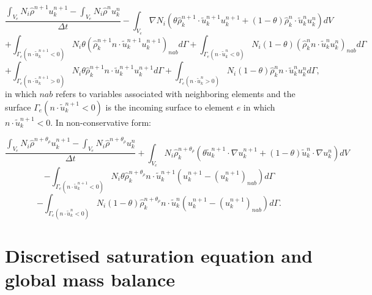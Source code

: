 \begin{equation}
\frac{
\int_{V_e} N_i \hat\rho^{n+1} u^{n+1}_k -
\int_{V_e} N_i \hat\rho^{n} u^{n}_k }
{\Delta t} 
- 
\int_{V_e} \nabla N_i 
(\theta \hat\rho_k^{n+1} \cdot \tilde u_k^{n+1} u_k^{n+1} +
(1-\theta) \hat\rho_k^{n} \cdot \tilde u_k^{n} u_k^{n} ) dV 
\label{inertia-disc-cons-1} 
\end{equation}
\begin{equation}
+ 
\int_{\Gamma_e (n\cdot \tilde u_k^{n+1}<0)} 
 N_i \theta ( \hat\rho_k^{n+1} n\cdot \tilde u_k^{n+1}  
u_k^{n+1})_{nab}  d\Gamma 
+ 
\int_{\Gamma_e (n\cdot \tilde u_k^{n}<0)} 
 N_i(1-\theta) (\hat\rho_k^{n} n\cdot \tilde u_k^{n} 
u_k^{n})_{nab}  d\Gamma 
\label{inertia-disc-cons-2} 
\end{equation}
\begin{equation}
+ 
\int_{\Gamma_e (n\cdot \tilde u_k^{n+1}>0)} N_i 
\theta  \hat\rho_k^{n+1} 
n\cdot \tilde u_k^{n+1}    u_k^{n+1}  d\Gamma
+ 
\int_{\Gamma_e (n\cdot \tilde u_k^{n}>0)} N_i 
 (1-\theta) \hat\rho_k^{n} n\cdot \tilde u_k^{n}  u_k^{n} d\Gamma ,
\label{inertia-disc-cons-3} 
\end{equation}
in which $nab$ refers to variables associated 
with neighboring elements and the surface 
$\Gamma_e (n\cdot \tilde u_k^{n+1}<0)$ is 
the incoming surface to 
element $e$ in which 
$n\cdot \tilde u_k^{n+1}<0$. 
In non-conservative form: 


\begin{equation}
\frac{
\int_{V_e} N_i \hat\rho^{n+\theta_\rho} u^{n+1}_k -
\int_{V_e} N_i \hat\rho^{n+\theta_\rho} u^{n}_k }
{\Delta t} 
+ 
\int_{V_e} N_i \hat\rho_k^{n+\theta_\rho}
(\theta  \tilde u_k^{n+1} \cdot\nabla u_k^{n+1} +
(1-\theta)  \tilde u_k^{n} \cdot\nabla u_k^{n} ) dV 
\label{inertia-disc-non-cons-1} 
\end{equation}
\begin{equation}
- 
\int_{\Gamma_e (n\cdot \tilde u_k^{n+1}<0)} 
N_i \theta \hat\rho_k^{n+\theta_\rho} n\cdot \tilde u_k^{n+1} (u_k^{n+1} - (u_k^{n+1})_{nab} ) d\Gamma 
\label{inertia-disc-non-cons-2} 
\end{equation}
\begin{equation}
- 
\int_{\Gamma_e (n\cdot \tilde u_k^{n}<0)} N_i (1-\theta)\hat\rho_k^{n+\theta_\rho} n\cdot \tilde u_k^{n}  (u_k^{n+1} - (u_k^{n+1})_{nab} ) d\Gamma . 
\label{inertia-disc-non-cons-3} 
\end{equation}

										

\section{Discretised saturation equation and global mass balance} 

